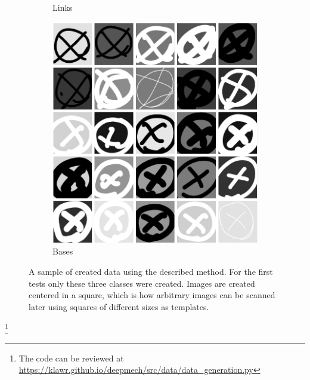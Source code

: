 \begin{figure}
\begin{subfigure}[b]{0.3\textwidth}
        \caption{Links}
        \label{fig:25_links}
    \end{subfigure}
    \begin{subfigure}[b]{0.3\textwidth}
        \includegraphics[width=\textwidth]{images/25_x.png}
        \caption{Bases}
        \label{fig:25_bases}
    \end{subfigure}
    \caption{A sample of created data using the described method. For the first tests only these three classes were created. Images are created centered in a square, which is how arbitrary images can be scanned later using squares of different sizes as templates. }
    \label{fig:generated_data_samples}
\end{figure}

\footnote{The code can be reviewed at \url{https://klawr.github.io/deepmech/src/data/data_generation.py}} %

